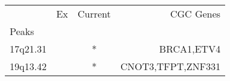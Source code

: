 \begin{tabular}{lccr}
\toprule
{} & Ex & Current &          CGC Genes \\
Peaks    &    &         &                    \\
\midrule
17q21.31 &    &       * &         BRCA1,ETV4 \\
19q13.42 &    &       * &  CNOT3,TFPT,ZNF331 \\
\bottomrule
\end{tabular}
